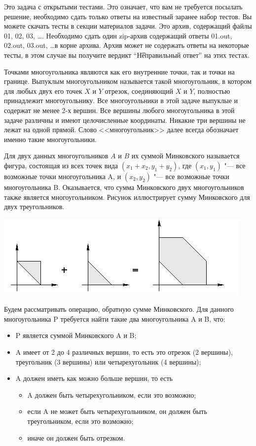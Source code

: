 Это задача с открытыми тестами. Это означает, что вам не требуется посылать решение, необходимо сдать только ответы на известный заранее набор тестов. Вы можете скачать тесты в секции материалов задачи. Это архив, содержащий файлы 01, 02, 03, \dots. Необходимо сдать один zip-архив содержащий ответы 01.out, 02.out, 03.out, \dots в корне архива. Архив может не содержать ответы на некоторые тесты, в этом случае вы получите вердикт ``\t{Неправильный ответ}'' на этих тестах.


Точками многоугольника являются как его внутренние точки, так и точки на границе.
Выпуклым многоугольником называется такой многоугольник, в котором для любых двух его точек $X$ и $Y$ отрезок,
соединяющий $X$ и $Y$, полностью принадлежит многоугольнику. Все многоугольники в этой задаче выпуклые и содержат
не менее 2-х вершин. Все вершины любого многоугольника в этой задаче различны и имеют целочисленные координаты.
Никакие три вершины не лежат на одной прямой. Слово <<многоугольник>> далее всегда обозначает именно такие многоугольники. 

Для двух данных многоугольников $A$ и $B$ их суммой Минковского называется фигура,
состоящая из всех точек вида $(x_1+x_2, y_1+y_2)$, где $(x_1, y_1)$ "--- все возможные точки многоугольника A, 
и $(x_2, y_2)$ "--- все возможные точки многоугольника B. 
Оказывается, что сумма Минковского двух многоугольников также является многоугольником.
Рисунок иллюстрирует сумму Минковского для двух треугольников.

\includegraphics{task1a.jpg}

Будем рассматривать операцию, обратную сумме Минковского. 
Для данного многоугольника P требуется найти такие два многоугольника A и B, что:
\begin{itemize}
\item   P является суммой Минковского A и B;  
\item   A имеет от 2 до 4 различных вершин, то есть это отрезок (2 вершины), треугольник (3 вершины) или четырехугольник (4 вершины); 
\item   A должен иметь как можно больше вершин, то есть
       \begin{itemize}
       \item   A должен быть четырехугольником, если это возможно; 
       \item   если A не может быть четырехугольником, он должен быть треугольником, если это возможно;
       \item   иначе он должен быть отрезком. 
       \end{itemize}
\end{itemize}

